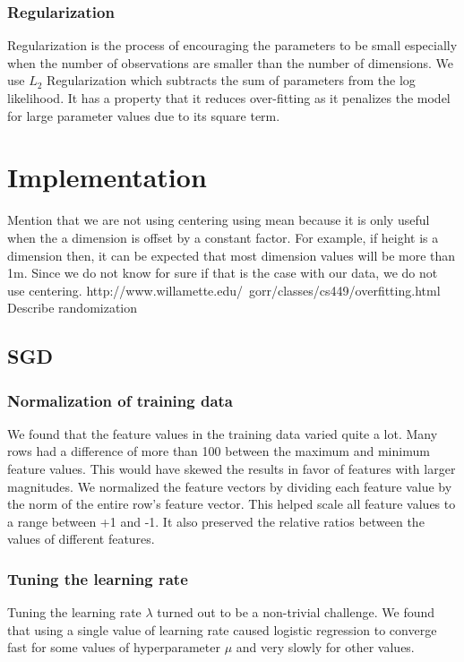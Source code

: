 \documentclass{acm_proc_article-sp}
\begin{document}
\subsubsection*{Regularization}
Regularization is the process of encouraging the parameters to be small especially when the number of observations are smaller than the number of dimensions\cite{ng2004feature}. We use $L_2$ Regularization which subtracts the sum of parameters from the log likelihood. It has a property that it reduces over-fitting as it penalizes the model for large parameter values due to its square term.

\section{Implementation}
Mention that we are not using centering using mean because it is only useful when the a dimension is offset by a constant factor\cite{bro2003centering}. For example, if height is a dimension then, it can be expected that most dimension values will be more than 1m. Since we do not know for sure if that is the case with our data, we do not use centering.
http://www.willamette.edu/~gorr/classes/cs449/overfitting.html
Describe randomization
\subsection{SGD}
\subsubsection{Normalization of training data}
We found that the feature values in the training data varied quite a lot. Many rows had a difference of more than 100 between the maximum and minimum feature values. This would have skewed the results in favor of features with larger magnitudes. We normalized the feature vectors by dividing each feature value by the norm of the entire row's feature vector. This helped scale all feature values to a range between +1 and -1. It also preserved the relative ratios between the values of different features. 
\subsubsection*{Tuning the learning rate}
Tuning the learning rate $\lambda$ turned out to be a non-trivial challenge. We found that using a single value of learning rate caused logistic regression to converge fast for some values of hyperparameter $\mu$ and very slowly for other values. 
\end{document}
